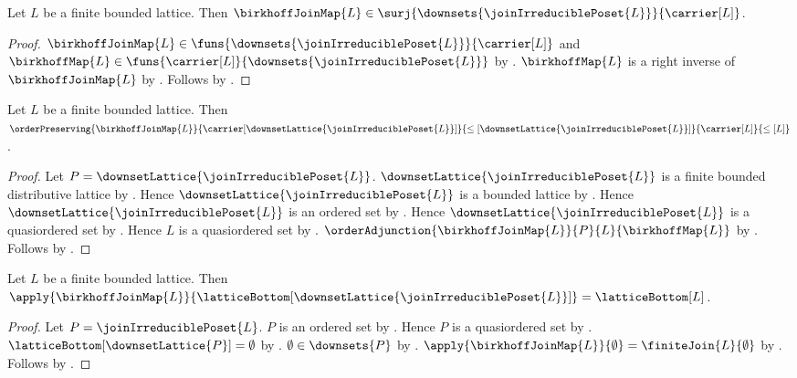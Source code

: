 \begin{proposition}\label{birkhoff_join_map_surjective}
    Let $L$ be a finite bounded lattice.
    Then $\birkhoffJoinMap{L}\in
        \surj{\downsets{\joinIrreduciblePoset{L}}}{\carrier[L]}$.
\end{proposition}
\begin{proof}
    $\birkhoffJoinMap{L}\in
        \funs{\downsets{\joinIrreduciblePoset{L}}}{\carrier[L]}$ and
        $\birkhoffMap{L}\in
        \funs{\carrier[L]}{\downsets{\joinIrreduciblePoset{L}}}$ by
        .
    $\birkhoffMap{L}$ is a right inverse of $\birkhoffJoinMap{L}$ by
        .
    Follows by .
\end{proof}

\begin{proposition}\label{birkhoff_join_map_order_preserving}
    Let $L$ be a finite bounded lattice.
    Then
        $\orderPreserving
            {\birkhoffJoinMap{L}}
            {\carrier[\downsetLattice{\joinIrreduciblePoset{L}}]}
            {\leq[\downsetLattice{\joinIrreduciblePoset{L}}]}
            {\carrier[L]}{\leq[L]}$.
\end{proposition}
\begin{proof}
    Let $P=\downsetLattice{\joinIrreduciblePoset{L}}$.
    $\downsetLattice{\joinIrreduciblePoset{L}}$ is a finite bounded
        distributive lattice by
        .
    Hence $\downsetLattice{\joinIrreduciblePoset{L}}$ is a bounded
        lattice by
        .
    Hence $\downsetLattice{\joinIrreduciblePoset{L}}$ is an ordered
        set by .
    Hence $\downsetLattice{\joinIrreduciblePoset{L}}$ is a
        quasiordered set by .
    Hence $L$ is a quasiordered set by .
    $\orderAdjunction{\birkhoffJoinMap{L}}{P}{L}{\birkhoffMap{L}}$ by
        .
    Follows by .
\end{proof}

\begin{proposition}\label{birkhoff_join_map_lattice_bottom}
    Let $L$ be a finite bounded lattice.
    Then $\apply{\birkhoffJoinMap{L}}
        {\latticeBottom[\downsetLattice{\joinIrreduciblePoset{L}}]}
        =\latticeBottom[L]$.
\end{proposition}
\begin{proof}
    Let $P=\joinIrreduciblePoset{L}$.
    $P$ is an ordered set by
        .
    Hence $P$ is a quasiordered set by .
    $\latticeBottom[\downsetLattice{P}]=\emptyset$ by
        .
    $\emptyset\in\downsets{P}$ by
        .
    $\apply{\birkhoffJoinMap{L}}{\emptyset}
        =\finiteJoin{L}{\emptyset}$ by
        .
    Follows by .
\end{proof}

